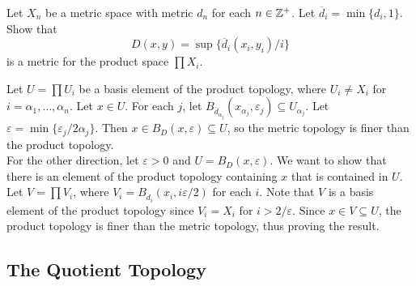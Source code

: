 	\begin{exercise}
		Let $X_n$ be a metric space with metric $d_n$ for each $n\in\mathbb{Z}^+$.
			Let $\overline{d}_i=\min\{d_i,1\}$. Show that
			\[ D(x,y) = \sup \{\overline{d}_i(x_i,y_i)/i\} \]
			is a metric for the product space $\prod X_i$.
	\end{exercise}
	\begin{solution*}

			Let $U = \prod U_i$ be a basis element of the product topology, where $U_i\neq X_i$ for $i=\alpha_1,\ldots,\alpha_n$. Let $x\in U$. For each $j$, let $B_{\overline{d}_{\alpha_j}}(x_{\alpha_j},\varepsilon_j)\subseteq U_{\alpha_j}$. Let $\varepsilon = \min\{\varepsilon_j/2\alpha_j\}$. Then $x\in B_{D}(x,\varepsilon)\subseteq U$, so the metric topology is finer than the product topology.\\
			For the other direction, let $\varepsilon>0$ and $U=B_D(x,\varepsilon)$. We want to show that there is an element of the product topology containing $x$ that is contained in $U$. Let $V=\prod V_i$, where $V_i = B_{\overline{d}_i}(x_i, i\varepsilon/2)$ for each $i$. Note that $V$ is a basis element of the product topology since $V_i=X_i$ for $i>2/\varepsilon$. Since $x\in V\subseteq U$, the product topology is finer than the metric topology, thus proving the result.
	\end{solution*}


\subsection{The Quotient Topology}

